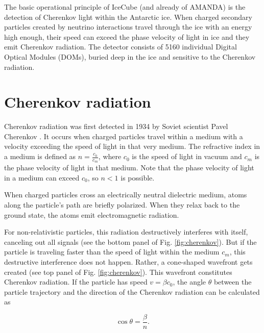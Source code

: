 \documentclass[
    a4paper, %
    fontsize=10pt, %
    twoside=false, %
    numbers=noenddot, %
    fontmethod=tex,
]{kaobook}
\begin{document}
The basic operational principle of IceCube (and already of AMANDA) is the detection of Cherenkov light within the Antarctic ice. When charged secondary particles created by neutrino interactions travel through the ice with an energy high enough, their speed can exceed the phase velocity of light in ice and they emit Cherenkov radiation. The detector consists of 5160 individual Digital Optical Modules (DOMs), buried deep in the ice and sensitive to the Cherenkov radiation.

\section{Cherenkov radiation} \label{cherenkov_radiation}

Cherenkov radiation was first detected in 1934 by Soviet scientist Pavel Cherenkov . It occurs when charged particles travel within a medium with a velocity exceeding the speed of light in that very medium. The refractive index in a medium is defined as $n=\frac{c_0}{c_m}$, where $c_0$ is the speed of light in vacuum and $c_m$ is the phase velocity of light in that medium. Note that the phase velocity of light in a medium can exceed $c_0$, so $n<1$ is possible. 

When charged particles cross an electrically neutral dielectric medium, atoms along the particle's path are briefly polarized. When they relax back to the ground state, the atoms emit electromagnetic radiation.

For non-relativistic particles, this radiation destructively interferes with itself, canceling out all signals (see the bottom panel of Fig. \ref{fig:cherenkov}). But if the particle is traveling faster than the speed of light within the medium $c_m$, this destructive interference does not happen. Rather, a cone-shaped wavefront gets created (see top panel of Fig. \ref{fig:cherenkov}). This wavefront constitutes Cherenkov radiation. If the particle has speed $v=\beta c_0$, the angle $\theta$ between the particle trajectory and the direction of the Cherenkov radiation can be calculated as 

\begin{equation}
\cos{\theta} = \frac{\beta}{n}.
\end{equation}
\end{document}

